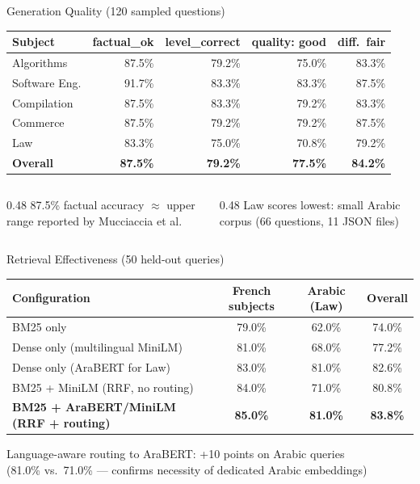 \documentclass[aspectratio=169]{beamer}
\begin{document}
\begin{frame}{Generation Quality (120 sampled questions)}
  \centering
  \begin{tabular}{lrrrr}
    \toprule
    \textbf{Subject} & \textbf{factual\_ok} & \textbf{level\_correct}
      & \textbf{quality: good} & \textbf{diff.\ fair} \\
    \midrule
    Algorithms    & 87.5\% & 79.2\% & 75.0\% & 83.3\% \\
    Software Eng. & 91.7\% & 83.3\% & 83.3\% & 87.5\% \\
    Compilation   & 87.5\% & 83.3\% & 79.2\% & 83.3\% \\
    Commerce      & 87.5\% & 79.2\% & 79.2\% & 87.5\% \\
    Law           & 83.3\% & 75.0\% & 70.8\% & 79.2\% \\
    \midrule
    \textbf{Overall} & \textbf{87.5\%} & \textbf{79.2\%}
      & \textbf{77.5\%} & \textbf{84.2\%} \\
    \bottomrule
  \end{tabular}

  \vspace{6pt}
  \begin{columns}[T]
    \begin{column}{0.48\textwidth}
      \small 87.5\% factual accuracy $\approx$ upper range reported by Mucciaccia et al.
    \end{column}
    \begin{column}{0.48\textwidth}
      \small Law scores lowest: small Arabic corpus (66 questions, 11 JSON files)
    \end{column}
  \end{columns}
\end{frame}

\begin{frame}{Retrieval Effectiveness (50 held-out queries)}
  \centering
  \begin{tabular}{lccc}
    \toprule
    \textbf{Configuration} & \textbf{French subjects}
      & \textbf{Arabic (Law)} & \textbf{Overall} \\
    \midrule
    BM25 only                              & 79.0\% & 62.0\% & 74.0\% \\
    Dense only (multilingual MiniLM)       & 81.0\% & 68.0\% & 77.2\% \\
    Dense only (AraBERT for Law)           & 83.0\% & 81.0\% & 82.6\% \\
    BM25 + MiniLM (RRF, no routing)       & 84.0\% & 71.0\% & 80.8\% \\
    \textbf{BM25 + AraBERT/MiniLM (RRF + routing)}
      & \textbf{85.0\%} & \textbf{81.0\%} & \textbf{83.8\%} \\
    \bottomrule
  \end{tabular}

  \vspace{8pt}
  \alert{Language-aware routing to AraBERT: +10 points on Arabic queries}\\
  \small (81.0\% vs.\ 71.0\% — confirms necessity of dedicated Arabic embeddings)
\end{frame}
\end{document}
